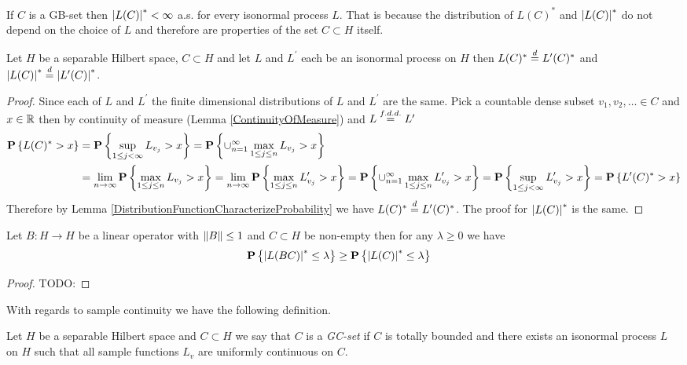 If $C$ is a GB-set then $\left \vert L(C) \right \vert^* < \infty$ a.s.  for every isonormal process $L$.  That is because the distribution of $L(C)^*$ and $\left \vert L(C) \right \vert^*$ do not depend on the choice of $L$ and therefore are properties of the set $C \subset H$ itself.
\begin{cor}Let $H$ be a separable Hilbert space, $C \subset H$ and let $L$ and $L^\prime$  each be an isonormal process on $H$ then $L(C)^* \overset{d}= L^\prime(C)^*$ and $\left \vert L(C) \right \vert^* \overset{d}= \left \vert L^\prime(C) \right \vert^*$.
\end{cor}
\begin{proof}
Since each of $L$ and $L^\prime$ the finite dimensional distributions of $L$ and $L^\prime$ are the same.  Pick a countable dense subset $v_1, v_2, \dotsc \in C$ and $x \in \mathbb{R}$ then by continuity of measure (Lemma \ref{ContinuityOfMeasure}) and $L \overset{f.d.d.}= L^\prime$
\begin{align*}
\textbf{P}\left \{L(C)^* > x \right \} &= \textbf{P}\left \{\sup_{1 \leq j < \infty} L_{v_j} > x \right \} = \textbf{P}\left \{\cup_{n=1}^\infty \max_{1 \leq j \leq n} L_{v_j} > x \right \} \\
&=  \lim_{n \to \infty} \textbf{P}\left \{\max_{1 \leq j \leq n} L_{v_j} > x \right \} =  \lim_{n \to \infty} \textbf{P}\left \{\max_{1 \leq j \leq n} L^{\prime}_{v_j} > x \right \} 
= \textbf{P}\left \{\cup_{n=1}^\infty \max_{1 \leq j \leq n} L^\prime_{v_j} > x \right \} 
= \textbf{P}\left \{\sup_{1 \leq j < \infty} L^\prime_{v_j} > x \right \} 
=\textbf{P}\left \{L^\prime(C)^* > x \right \} 
\end{align*}
Therefore by Lemma \ref{DistributionFunctionCharacterizeProbability} we have $L(C)^* \overset{d}= L^\prime(C)^*$.  The proof for $\left \vert L(C) \right \vert^*$ is the same.
\end{proof}

\begin{lem}\label{EssentialSupremumUnderContraction}Let $B : H \to H$ be a linear operator with $\left \lVert B \right \rVert \leq 1$ and $C \subset H$ be non-empty then for any $\lambda \geq 0$ we have
\begin{align*}
\textbf{P}\left \{\left \vert L(BC) \right \vert^* \leq \lambda \right \} &\geq \textbf{P}\left \{\left \vert L(C) \right \vert^* \leq \lambda \right \}
\end{align*}
\end{lem}
\begin{proof}
TODO:
\end{proof}

With regards to sample continuity we have the following definition.
\begin{defn}Let $H$ be a separable Hilbert space and $C \subset H$ we say that $C$ is a \emph{GC-set} if $C$ is totally bounded and there exists an isonormal process $L$ on $H$ such that all sample functions $L_v$ are uniformly continuous on $C$.
\end{defn}

